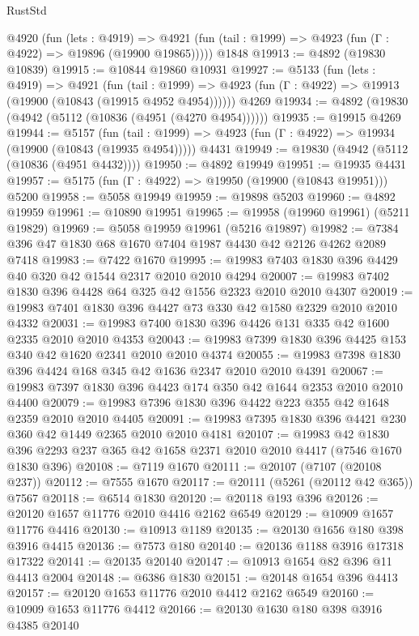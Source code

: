 \begin{lexlean}{RustStd}
\begin{coremodule}
    @4920
      (fun (lets : @4919) =>
      @4921 (fun (tail : @1999) => @4923 (fun (Γ : @4922) => @19896 (@19900 @19865)))))
    @1848
@19913 := @4892 (@19830 @10839)
@19915 := @10844 @19860 @10931
@19927 := @5133
    (fun (lets : @4919) =>
    @4921
      (fun (tail : @1999) =>
      @4923 (fun (Γ : @4922) => @19913 (@19900 (@10843 (@19915 @4952 @4954))))))
    @4269
@19934 := @4892 (@19830 (@4942 (@5112 (@10836 (@4951 (@4270 @4954))))))
@19935 := @19915 @4269
@19944 := @5157
    (fun (tail : @1999) => @4923 (fun (Γ : @4922) => @19934 (@19900 (@10843 (@19935 @4954)))))
    @4431
@19949 := @19830 (@4942 (@5112 (@10836 (@4951 @4432))))
@19950 := @4892 @19949
@19951 := @19935 @4431
@19957 := @5175 (fun (Γ : @4922) => @19950 (@19900 (@10843 @19951))) @5200
@19958 := @5058 @19949
@19959 := @19898 @5203
@19960 := @4892 @19959
@19961 := @10890 @19951
@19965 := @19958 (@19960 @19961) (@5211 @19829)
@19969 := @5058 @19959 @19961 (@5216 @19897)
@19982 := @7384 @396 @47 @1830 @68 @1670 @7404 @1987 @4430 @42 @2126 @4262 @2089 @7418
@19983 := @7422 @1670
@19995 := @19983 @7403 @1830 @396 @4429 @40 @320 @42 @1544 @2317 @2010 @2010 @4294
@20007 := @19983 @7402 @1830 @396 @4428 @64 @325 @42 @1556 @2323 @2010 @2010 @4307
@20019 := @19983 @7401 @1830 @396 @4427 @73 @330 @42 @1580 @2329 @2010 @2010 @4332
@20031 := @19983 @7400 @1830 @396 @4426 @131 @335 @42 @1600 @2335 @2010 @2010 @4353
@20043 := @19983 @7399 @1830 @396 @4425 @153 @340 @42 @1620 @2341 @2010 @2010 @4374
@20055 := @19983 @7398 @1830 @396 @4424 @168 @345 @42 @1636 @2347 @2010 @2010 @4391
@20067 := @19983 @7397 @1830 @396 @4423 @174 @350 @42 @1644 @2353 @2010 @2010 @4400
@20079 := @19983 @7396 @1830 @396 @4422 @223 @355 @42 @1648 @2359 @2010 @2010 @4405
@20091 := @19983 @7395 @1830 @396 @4421 @230 @360 @42 @1449 @2365 @2010 @2010 @4181
@20107 := @19983
    @42
    @1830
    @396
    @2293
    @237
    @365
    @42
    @1658
    @2371
    @2010
    @2010
    @4417
    (@7546 @1670 @1830 @396)
@20108 := @7119 @1670
@20111 := @20107 (@7107 (@20108 @237))
@20112 := @7555 @1670
@20117 := @20111 (@5261 (@20112 @42 @365)) @7567
@20118 := @6514 @1830
@20120 := @20118 @193 @396
@20126 := @20120 @1657 @11776 @2010 @4416 @2162 @6549
@20129 := @10909 @1657 @11776 @4416
@20130 := @10913 @1189
@20135 := @20130 @1656 @180 @398 @3916 @4415
@20136 := @7573 @180
@20140 := @20136 @1188 @3916 @17318 @17322
@20141 := @20135 @20140
@20147 := @10913 @1654 @82 @396 @11 @4413 @2004
@20148 := @6386 @1830
@20151 := @20148 @1654 @396 @4413
@20157 := @20120 @1653 @11776 @2010 @4412 @2162 @6549
@20160 := @10909 @1653 @11776 @4412
@20166 := @20130 @1630 @180 @398 @3916 @4385 @20140

\end{coremodule}
\end{lexlean}
